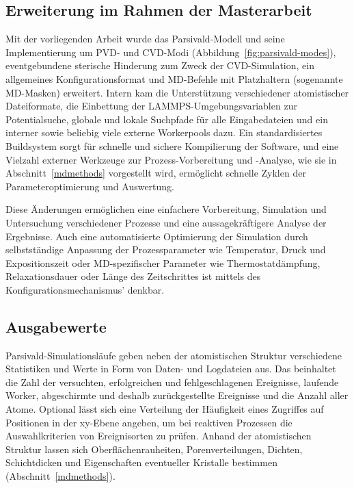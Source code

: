 \subsection{Erweiterung im Rahmen der Masterarbeit}

Mit der vorliegenden Arbeit wurde das Parsivald-Modell und seine Implementierung um PVD- und CVD-Modi (Abbildung~\ref{fig:parsivald-modes}), eventgebundene sterische Hinderung zum Zweck der CVD-Simu\-lation, ein allgemeines Konfigurationsformat und MD-Befehle mit Platzhaltern (sogenannte MD-Masken) erweitert.
Intern kam die Unterstützung verschiedener atomistischer Dateiformate, die Einbettung der LAMMPS-Umgebungs\-variablen zur Potentialsuche, globale und lokale Suchpfade für alle Eingabedateien und ein interner sowie beliebig viele externe Workerpools dazu.
Ein standardisiertes Buildsystem sorgt für schnelle und sichere Kompilierung der Software, und eine Vielzahl externer Werkzeuge zur Prozess-Vorbereitung und -Analyse, wie sie in Abschnitt~\ref{mdmethods} vorgestellt wird, ermöglicht schnelle Zyklen der Parameteroptimierung und Auswertung.

Diese Änderungen ermöglichen eine einfachere Vorbereitung, Simulation und Untersuchung verschiedener Prozesse und eine aussagekräftigere Analyse der Ergebnisse.
Auch eine automatisierte Optimierung der Simulation durch selbstständige Anpassung der Prozessparameter wie Temperatur, Druck und Expositionszeit oder MD-spezifischer Parameter wie Thermostatdämpfung, Relaxationsdauer oder Länge des Zeitschrittes ist mittels des Konfigurationsmechanismus' denkbar.


\subsection{Ausgabewerte}

Parsivald-Simulationsläufe geben neben der atomistischen Struktur verschiedene Statistiken und Werte in Form von Daten- und Logdateien aus.
Das beinhaltet die Zahl der versuchten, erfolgreichen und fehlgeschlagenen Ereignisse, laufende Worker, abgeschirmte und deshalb zurückgestellte Ereignisse und die Anzahl aller Atome.
Optional lässt sich eine Verteilung der Häufigkeit eines Zugriffes auf Positionen in der xy-Ebene angeben, um bei reaktiven Prozessen die Auswahlkriterien von Ereignisorten zu prüfen.
Anhand der atomistischen Struktur lassen sich Oberflächenrauheiten, Porenverteilungen, Dichten, Schichtdicken und Eigenschaften eventueller Kristalle bestimmen (Abschnitt~\ref{mdmethods}).

